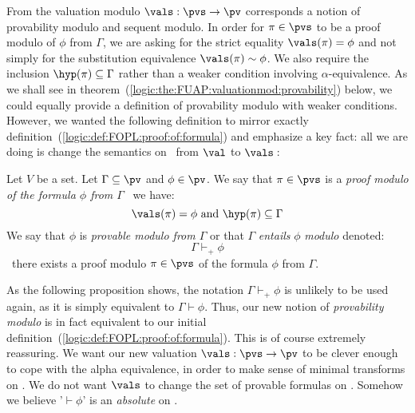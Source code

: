 From the valuation modulo $\vals:\pvs\to\pv$ corresponds a notion of
provability modulo and sequent modulo. In order for $\pi\in\pvs$ to
be a proof modulo of $\phi$ from $\Gamma$, we are asking for the
strict equality $\vals(\pi)=\phi$ and not simply for the
substitution equivalence $\vals(\pi)\sim\phi$. We also require the
inclusion $\hyp(\pi)\subseteq\Gamma$ rather than a weaker condition
involving $\alpha$-equivalence. As we shall see in
theorem~(\ref{logic:the:FUAP:valuationmod:provability}) below, we
could equally provide a definition of provability modulo with weaker
conditions. However, we wanted the following definition to mirror
exactly definition~(\ref{logic:def:FOPL:proof:of:formula}) and
emphasize a key fact: all we are doing is change the semantics on
\pvs\ from $\val$ to $\vals$\,:

\begin{defin}\label{logic:def:FUAP:valuationmod:proof:modulo}
Let $V$ be a set. Let $\Gamma\subseteq\pv$ and $\phi\in\pv$. We say
that $\pi\in\pvs$ is a {\em proof modulo of the formula $\phi$ from
$\Gamma$} \ifand\ we have:
    \[
    \vals(\pi)=\phi\mbox{\ and\ }\hyp(\pi)\subseteq\Gamma
    \]
We say that $\phi$ is {\em provable modulo from $\Gamma$} or that
$\Gamma$ {\em entails} $\phi$ {\em modulo} denoted:
    \[
    \Gamma\vdash_{+}\phi
    \]
\ifand\ there exists a proof modulo $\pi\in\pvs$ of the formula
$\phi$ from $\Gamma$.
\end{defin}

As the following proposition shows, the notation
$\Gamma\vdash_{+}\phi$ is unlikely to be used again, as it is simply
equivalent to $\Gamma\vdash\phi$. Thus, our new notion of {\em
provability modulo} is in fact equivalent to our initial
definition~(\ref{logic:def:FOPL:proof:of:formula}). This is of
course extremely reassuring. We want our new valuation
$\vals:\pvs\to\pv$ to be clever enough to cope with the alpha
equivalence, in order to make sense of minimal transforms on \pvs. We
do not want $\vals$ to change the set of provable formulas on \pv.
Somehow we believe '$\vdash\phi$' is an {\em absolute} on \pv.

